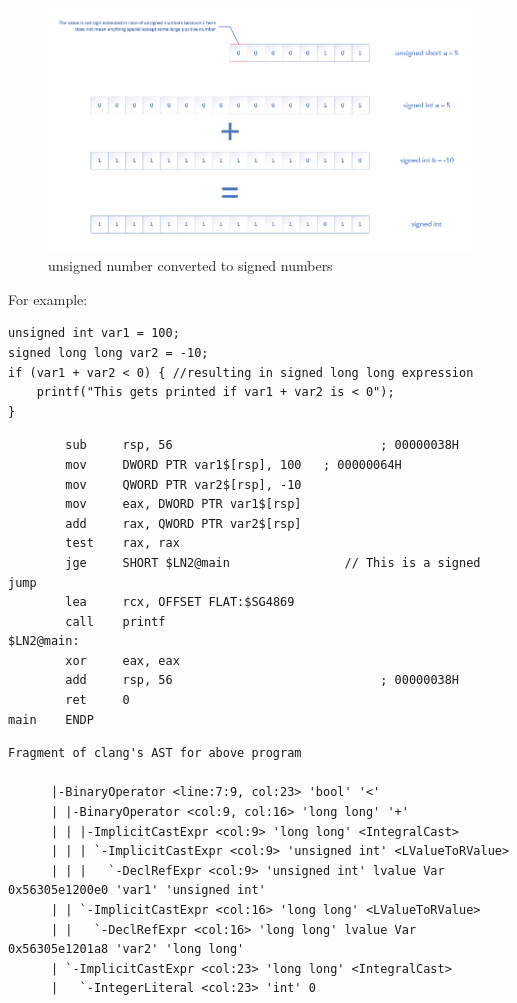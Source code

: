 \documentclass{article}
\begin{document}
\begin{figure}[H]
\centering
\includegraphics[width=\textwidth]{unsigned-short-to-signed-int.png}
\caption{unsigned number converted to signed numbers}
\end{figure}

For example:
\begin{verbatim}
unsigned int var1 = 100;
signed long long var2 = -10;
if (var1 + var2 < 0) { //resulting in signed long long expression
    printf("This gets printed if var1 + var2 is < 0");
}
\end{verbatim}
\begin{verbatim}
        sub     rsp, 56                             ; 00000038H
        mov     DWORD PTR var1$[rsp], 100   ; 00000064H
        mov     QWORD PTR var2$[rsp], -10
        mov     eax, DWORD PTR var1$[rsp]
        add     rax, QWORD PTR var2$[rsp]
        test    rax, rax
        jge     SHORT $LN2@main                // This is a signed jump
        lea     rcx, OFFSET FLAT:$SG4869
        call    printf
$LN2@main:
        xor     eax, eax
        add     rsp, 56                             ; 00000038H
        ret     0
main    ENDP
\end{verbatim}
\begin{verbatim}
Fragment of clang's AST for above program

      |-BinaryOperator <line:7:9, col:23> 'bool' '<'
      | |-BinaryOperator <col:9, col:16> 'long long' '+'
      | | |-ImplicitCastExpr <col:9> 'long long' <IntegralCast>
      | | | `-ImplicitCastExpr <col:9> 'unsigned int' <LValueToRValue>
      | | |   `-DeclRefExpr <col:9> 'unsigned int' lvalue Var 0x56305e1200e0 'var1' 'unsigned int'
      | | `-ImplicitCastExpr <col:16> 'long long' <LValueToRValue>
      | |   `-DeclRefExpr <col:16> 'long long' lvalue Var 0x56305e1201a8 'var2' 'long long'
      | `-ImplicitCastExpr <col:23> 'long long' <IntegralCast>
      |   `-IntegerLiteral <col:23> 'int' 0
\end{verbatim}
\end{document}
